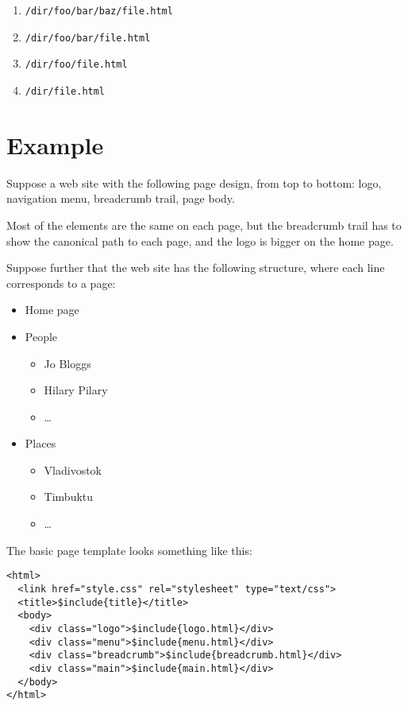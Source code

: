 \documentclass[english]{scrartcl}
\begin{document}
\begin{enumerate}
\item \verb|/dir/foo/bar/baz/file.html|
\item \verb|/dir/foo/bar/file.html|
\item \verb|/dir/foo/file.html|
\item \verb|/dir/file.html|
\end{enumerate}

\section{Example}

Suppose a web site with the following page design, from top to bottom: logo, navigation menu, breadcrumb trail, page body.

Most of the elements are the same on each page, but the breadcrumb trail has to show the canonical path to each page, and the logo is bigger on the home page.

Suppose further that the web site has the following structure, where each line corresponds to a page:

\begin{itemize}
\item Home page
\item People
  \begin{itemize}
  \item Jo Bloggs
  \item Hilary Pilary
  \item \dots
  \end{itemize}
\item Places
  \begin{itemize}
  \item Vladivostok
  \item Timbuktu
  \item \dots
  \end{itemize}
\end{itemize}

The basic page template looks something like this:

\begin{verbatim}
<html>
  <link href="style.css" rel="stylesheet" type="text/css">
  <title>$include{title}</title>
  <body>
    <div class="logo">$include{logo.html}</div>
    <div class="menu">$include{menu.html}</div>
    <div class="breadcrumb">$include{breadcrumb.html}</div>
    <div class="main">$include{main.html}</div>
  </body>
</html>
\end{verbatim}
\end{document}
